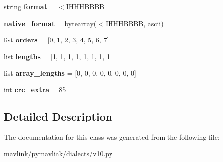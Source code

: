 \begin{DoxyCompactItemize}
\mbox{\label{classpymavlink_1_1dialects_1_1v10_1_1MAVLink__distance__sensor__message_a01f3a8b9f0d62dcc755dde6fd26c0c06}} 
string {\bfseries format} = \textquotesingle{}$<$I\+H\+H\+H\+B\+B\+BB\textquotesingle{}
\item 
\mbox{\label{classpymavlink_1_1dialects_1_1v10_1_1MAVLink__distance__sensor__message_ad584a6b07a7ced655e9149d9516217fd}} 
{\bfseries native\+\_\+format} = bytearray(\textquotesingle{}$<$I\+H\+H\+H\+B\+B\+BB\textquotesingle{}, \textquotesingle{}ascii\textquotesingle{})
\item 
\mbox{\label{classpymavlink_1_1dialects_1_1v10_1_1MAVLink__distance__sensor__message_ab420be5353d8f653641ca13dbe05b796}} 
list {\bfseries orders} = \mbox{[}0, 1, 2, 3, 4, 5, 6, 7\mbox{]}
\item 
\mbox{\label{classpymavlink_1_1dialects_1_1v10_1_1MAVLink__distance__sensor__message_a1c93a27c8ef86763e083ad8e709dba14}} 
list {\bfseries lengths} = \mbox{[}1, 1, 1, 1, 1, 1, 1, 1\mbox{]}
\item 
\mbox{\label{classpymavlink_1_1dialects_1_1v10_1_1MAVLink__distance__sensor__message_a42b78674ebb808014430ce3b7b87c88f}} 
list {\bfseries array\+\_\+lengths} = \mbox{[}0, 0, 0, 0, 0, 0, 0, 0\mbox{]}
\item 
\mbox{\label{classpymavlink_1_1dialects_1_1v10_1_1MAVLink__distance__sensor__message_a6a50abab56b59709d1693e09c2112d95}} 
int {\bfseries crc\+\_\+extra} = 85
\end{DoxyCompactItemize}


\subsection{Detailed Description}
\begin{DoxyVerb}\end{DoxyVerb}
 

The documentation for this class was generated from the following file\+:\begin{DoxyCompactItemize}
\item 
mavlink/pymavlink/dialects/v10.\+py\end{DoxyCompactItemize}
